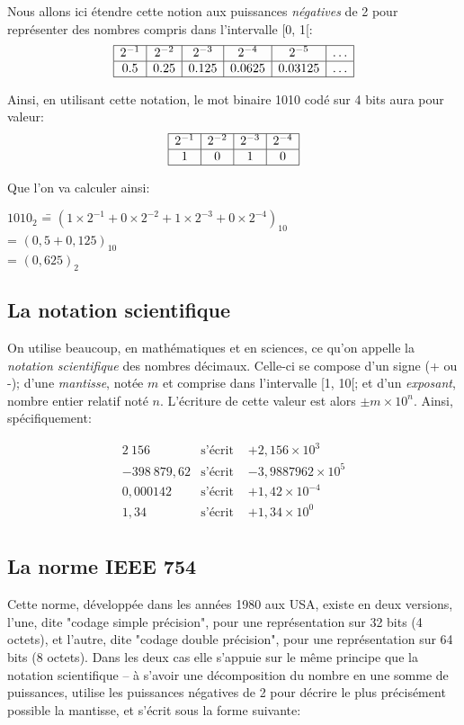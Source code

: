 \documentclass[12pt]{article}
\begin{document}
	Nous allons ici étendre cette notion aux puissances \textit{négatives} de 2 pour représenter des nombres compris dans l'intervalle [0, 1[:
	 \[
	\begin{array}{|c|c|c|c|c|c|}
		\hline
		2^{-1} & 2^{-2} & 2^{-3} & 2^{-4} &  2^{-5} & \ldots \\
		\hline
		0.5 & 0.25 & 0.125 & 0.0625 & 0.03125 &  \ldots \\
		\hline
	\end{array}
	\]
	
	Ainsi, en utilisant cette notation, le mot binaire 1010 codé sur 4 bits aura pour valeur:
		 \[
	\begin{array}{|c|c|c|c|}
		\hline
		2^{-1} & 2^{-2} & 2^{-3} & 2^{-4} \\
		\hline
		1 & 0 & 1 & 0  \\
		\hline
	\end{array}
	\]
	
	Que l'on va calculer ainsi:
	
	\begin{tabbing}
		$1010_{2}$ \==  $(1 \times 2^{-1} + 0 \times 2^{-2} + 1 \times 2^{-3} + 0 \times 2^{-4})_{10}$ \\
		\>= $(0,5 + 0,125)_{10}$ \\
		\>= $(0,625)_{2}$
	\end{tabbing}
	
	\subsection{La notation scientifique}
	On utilise beaucoup, en mathématiques et en sciences, ce qu'on appelle la \textit{notation scientifique} des nombres décimaux. Celle-ci se compose d'un signe (+ ou -); d'une \textit{mantisse}, notée $m$ et comprise dans l'intervalle [1, 10[; et d'un \textit{exposant}, nombre entier relatif noté $n$. L'écriture de cette valeur est alors $\pm m \times 10^n$. Ainsi, spécifiquement:
	
	\[
	\begin{array}{rll}
		2\ 156 & \text{s'écrit } & +2,156 \times 10^3 \\
		-398\ 879,62 & \text{s'écrit } & -3,9887962 \times 10^5 \\
		0,000142 & \text{s'écrit } & +1,42 \times 10^{-4} \\
		1,34 & \text{s'écrit } & +1,34 \times 10^0 \\
	\end{array}
	\]
	
	\subsection{La norme IEEE 754}
	Cette norme, développée dans les années 1980 aux USA, existe en deux versions, l'une, dite "codage simple précision", pour une représentation sur 32 bits (4 octets), et l'autre, dite "codage double précision", pour une représentation sur 64 bits (8 octets). Dans les deux cas elle s'appuie sur le même principe que la notation scientifique -- à s'avoir une décomposition du nombre en une somme de puissances, utilise les puissances négatives de 2 pour décrire le plus précisément possible la mantisse, et s'écrit sous la forme suivante:
	
\end{document}

